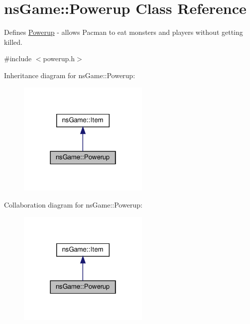 \hypertarget{classns_game_1_1_powerup}{}\section{ns\+Game\+:\+:Powerup Class Reference}
\label{classns_game_1_1_powerup}


Defines \hyperlink{classns_game_1_1_powerup}{Powerup} -\/ allows Pacman to eat monsters and players without getting killed.  




{\ttfamily \#include $<$powerup.\+h$>$}



Inheritance diagram for ns\+Game\+:\+:Powerup\+:\nopagebreak
\begin{figure}[H]
\begin{center}
\leavevmode
\includegraphics[width=178pt]{classns_game_1_1_powerup__inherit__graph}
\end{center}
\end{figure}


Collaboration diagram for ns\+Game\+:\+:Powerup\+:\nopagebreak
\begin{figure}[H]
\begin{center}
\leavevmode
\includegraphics[width=178pt]{classns_game_1_1_powerup__coll__graph}
\end{center}
\end{figure}
